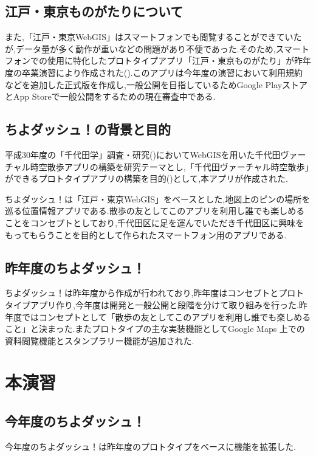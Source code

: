 \documentclass[a4paper, twoside]{jarticle}
\begin{document}
\begin{multicols}{2}
\subsection{江戸・東京ものがたりについて}
また,「江戸・東京WebGIS」はスマートフォンでも閲覧することができていたが,データ量が多く動作が重いなどの問題があり不便であった.そのため,スマートフォンでの使用に特化したプロトタイプアプリ「江戸・東京ものがたり」が昨年度の卒業演習により作成された(\cite{houkokusyo_30}).このアプリは今年度の演習において利用規約などを追加した正式版を作成し,一般公開を目指しているためGoogle PlayストアとApp Storeで一般公開をするための現在審査中である.

\subsection{ちよダッシュ！の背景と目的}
平成30年度の「千代田学」調査・研究(\cite{tiyokenkyu})においてWebGISを用いた千代田ヴァーチャル時空散歩アプリの構築を研究テーマとし,「千代田ヴァーチャル時空散歩」ができるプロトタイプアプリの構築を目的(\cite{tiyodagaku_houkokusyo})として,本アプリが作成された.

ちよダッシュ！は「江戸・東京WebGIS」をベースとした,地図上のピンの場所を巡る位置情報アプリである.散歩の友としてこのアプリを利用し誰でも楽しめることをコンセプトとしており,千代田区に足を運んでいただき千代田区に興味をもってもらうことを目的として作られたスマートフォン用のアプリである.

\subsection{昨年度のちよダッシュ！}
ちよダッシュ！は昨年度から作成が行われており,昨年度はコンセプトとプロトタイプアプリ作り,今年度は開発と一般公開と段階を分けて取り組みを行った.昨年度ではコンセプトとして「散歩の友としてこのアプリを利用し誰でも楽しめること」と決まった.またプロトタイプの主な実装機能としてGoogle Maps 上での資料閲覧機能とスタンプラリー機能が追加された.


\section{本演習}


\subsection{今年度のちよダッシュ！}
今年度のちよダッシュ！は昨年度のプロトタイプをベースに機能を拡張した.


\end{multicols}
\end{document}
